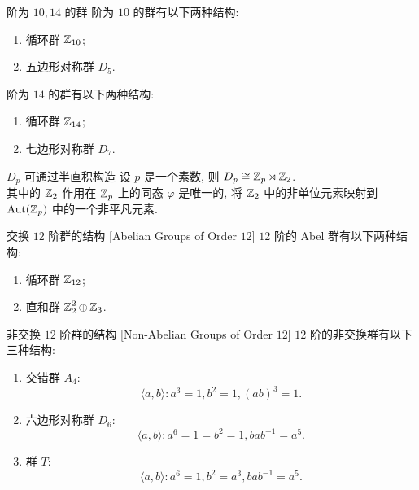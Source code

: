             \begin{ins}
                {阶为 \(10, 14\) 的群}
                阶为 \(10\) 的群有以下两种结构:
                \begin{enumerate}
                    \item 循环群 \(\operatorname{\mathbb{Z}}_{10}\);
                    \item 五边形对称群 \(D_5\).
                \end{enumerate}
                阶为 \(14\) 的群有以下两种结构:
                \begin{enumerate}
                    \item 循环群 \(\operatorname{\mathbb{Z}}_{14}\);
                    \item 七边形对称群 \(D_7\).
                \end{enumerate}
            \end{ins}

            \begin{crl}
                {\(D_p\) 可通过半直积构造}
                设 \(p\) 是一个素数, 则 \(D_p\cong \operatorname{\mathbb{Z}}_p\rtimes \operatorname{\mathbb{Z}}_2\).\\
                其中的 \(\operatorname{\mathbb{Z}}_2\) 作用在 \(\operatorname{\mathbb{Z}}_p\) 上的同态 \(\varphi\) 是唯一的, 将 \(\operatorname{\mathbb{Z}}_2\) 中的非单位元素映射到 \(\operatorname{Aut}(\operatorname{\mathbb{Z}}_p)\) 中的一个非平凡元素.
            \end{crl}

            \begin{xmp}
                {交换 \(12\) 阶群的结构}
                [Abelian Groups of Order \(12\)]
                \(12\) 阶的 Abel 群有以下两种结构:
                \begin{enumerate}
                    \item 循环群 \(\operatorname{\mathbb{Z}}_{12}\);
                    \item 直和群 \(\operatorname{\mathbb{Z}}_2^2\oplus\operatorname{\mathbb{Z}}_3\).
                \end{enumerate}
            \end{xmp}

            \begin{xmp}
                {非交换 \(12\) 阶群的结构}
                [Non-Abelian Groups of Order \(12\)]
                \(12\) 阶的非交换群有以下三种结构:
                \begin{enumerate}
                    \item 交错群 \(A_4\): \[\langle a,b\rangle: a^3=1, b^2=1, (ab)^3=1.\]
                    \item 六边形对称群 \(D_6\): \[\langle a,b\rangle: a^6=1=b^2=1, bab^{-1}=a^5.\]
                    \item 群 \(T\): \[\langle a,b\rangle: a^6=1, b^2=a^3, bab^{-1}=a^5.\]
                \end{enumerate}
            \end{xmp}

